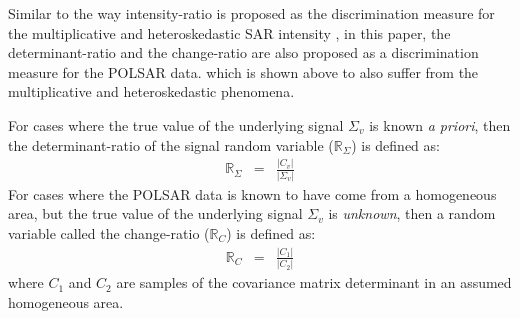 \documentclass[journal]{IEEEtran}
\begin{document}
Similar to the way intensity-ratio is proposed as the discrimination measure for the multiplicative and heteroskedastic SAR intensity \cite{Rignot_1993_TGRS_896},
in this paper, the determinant-ratio and the change-ratio are also proposed as a discrimination measure for the POLSAR data.
  which is shown above to also suffer from the multiplicative and heteroskedastic phenomena.

For cases where the true value of the underlying signal $\Sigma_v$ is known \textit{a priori},
then the determinant-ratio of the signal random variable ($\mathbb{R}_{\Sigma}$) %
  is defined as:
\begin{eqnarray}
  \mathbb{R}_{\Sigma} &=& \frac{|C_v|}{|\Sigma_v|} \label{eqn:determinant_ratio_observables}%
\end{eqnarray}
For cases where the POLSAR data is known to have come from a homogeneous area, but the true value of the underlying signal $\Sigma_v$ is \textit{unknown},
 then a random variable called the change-ratio ($\mathbb{R}_{C}$)  is defined as:
\begin{eqnarray}
  \mathbb{R}_{C} &=& \frac{|C_1|}{|C_2|} \label{eqn:determinant_ratio_samples_observables}%
\end{eqnarray}
where $C_1$ and $C_2$ are samples of the covariance matrix determinant in an assumed homogeneous area. 

\end{document}
